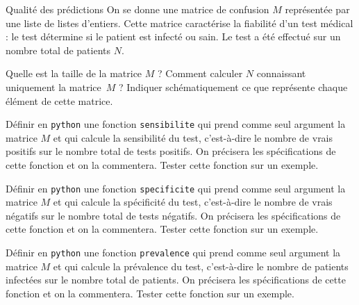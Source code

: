 \begin{exo}[PC][1][python]{Qualité des prédictions}
On se donne une matrice de confusion $M$ représentée par une liste de listes d’entiers. Cette matrice caractérise la fiabilité d’un test médical : le test détermine si le patient est infecté ou sain. Le test a été effectué sur un nombre total de patients $N$.
\begin{quest}
\item Quelle est la taille de la matrice $M$ ? Comment calculer $N$ connaissant uniquement la matrice~$M$ ? Indiquer schématiquement ce que représente chaque élément de cette matrice.
\item Définir en \texttt{python} une fonction \texttt{sensibilite} qui prend comme seul argument  la matrice $M$ et qui calcule la sensibilité du test, c’est-à-dire le nombre de vrais positifs sur le nombre total de tests positifs. On précisera les spécifications de cette fonction et on la commentera. Tester cette fonction sur un exemple.
\item Définir en \texttt{python} une fonction \texttt{specificite}  qui prend comme seul argument  la matrice $M$ et qui calcule la spécificité du test, c’est-à-dire le nombre de vrais négatifs sur le nombre total de tests négatifs. On précisera les spécifications de cette fonction et on la commentera. Tester cette fonction sur un exemple.
\item Définir en \texttt{python} une fonction \texttt{prevalence} qui prend comme seul argument la matrice $M$ et qui calcule la prévalence du test, c’est-à-dire le nombre de patients infectées sur le nombre total de patients. On précisera les spécifications de cette fonction et on la commentera. Tester cette fonction sur un exemple.
\end{quest}
\end{exo}

